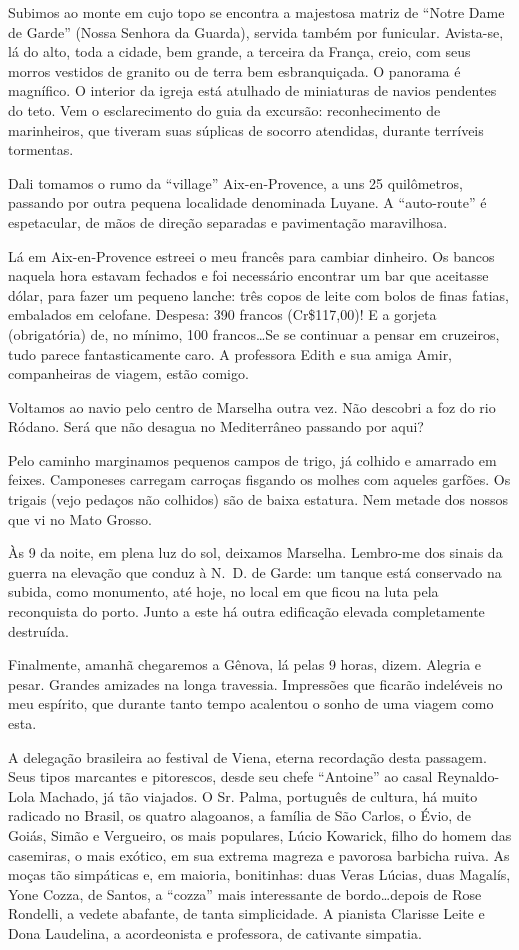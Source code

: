 Subimos ao monte em cujo topo se encontra a majestosa matriz de ``Notre Dame de Garde'' (Nossa Senhora da Guarda), servida também por funicular. Avista-se, lá do alto, toda a cidade, bem grande, a terceira da França, creio, com seus morros vestidos de granito ou de terra bem esbranquiçada. O panorama é magnífico. O interior da igreja está atulhado de miniaturas de navios pendentes do teto. Vem o esclarecimento do guia da excursão: reconhecimento de marinheiros, que tiveram suas súplicas de socorro atendidas, durante terríveis tormentas.

Dali tomamos o rumo da ``village'' Aix-en-Provence, a uns 25 quilômetros, passando por outra pequena localidade denominada Luyane. A ``auto-route'' é espetacular, de mãos de direção separadas e pavimentação maravilhosa.

Lá em Aix-en-Provence estreei o meu francês para cambiar dinheiro. Os bancos naquela hora estavam fechados e foi necessário encontrar um bar que aceitasse dólar, para fazer um pequeno lanche: três copos de leite com bolos de finas fatias, embalados em celofane. Despesa: 390 francos (Cr\$117,00)! E a gorjeta (obrigatória) de, no mínimo, 100 francos\ldots Se se continuar a pensar em cruzeiros, tudo parece fantasticamente caro. A professora Edith e sua amiga Amir, companheiras de viagem, estão comigo.

Voltamos ao navio pelo centro de Marselha outra vez. Não descobri a foz do rio Ródano. Será que não desagua no Mediterrâneo passando por aqui?

Pelo caminho marginamos pequenos campos de trigo, já colhido e amarrado em feixes. Camponeses carregam carroças fisgando os molhes com aqueles garfões. Os trigais (vejo pedaços não colhidos) são de baixa estatura. Nem metade dos nossos que vi no Mato Grosso.

Às 9 da noite, em plena luz do sol, deixamos Marselha. Lembro-me dos sinais da guerra na elevação que conduz à N.~D. de Garde: um tanque está conservado na subida, como monumento, até hoje, no local em que ficou na luta pela reconquista do porto. Junto a este há outra edificação elevada completamente destruída.

Finalmente, amanhã chegaremos a Gênova, lá pelas 9 horas, dizem. Alegria e pesar. Grandes amizades na longa travessia. Impressões que ficarão indeléveis no meu espírito, que durante tanto tempo acalentou o sonho de uma viagem como esta.

A delegação brasileira ao festival de Viena, eterna recordação desta passagem. Seus tipos marcantes e pitorescos, desde seu chefe ``Antoine'' ao casal Reynaldo-Lola Machado, já tão viajados. O Sr. Palma, português de cultura, há muito radicado no Brasil, os quatro alagoanos, a família de São Carlos, o Évio, de Goiás, Simão e Vergueiro, os mais populares, Lúcio Kowarick, filho do homem das casemiras, o mais exótico, em sua extrema magreza e pavorosa barbicha ruiva. As moças tão simpáticas e, em maioria, bonitinhas: duas Veras Lúcias, duas Magalís, Yone Cozza, de Santos, a ``cozza'' mais interessante de bordo\ldots depois de Rose Rondelli, a vedete abafante, de tanta simplicidade. A pianista Clarisse Leite e Dona Laudelina, a acordeonista e professora, de cativante simpatia.

